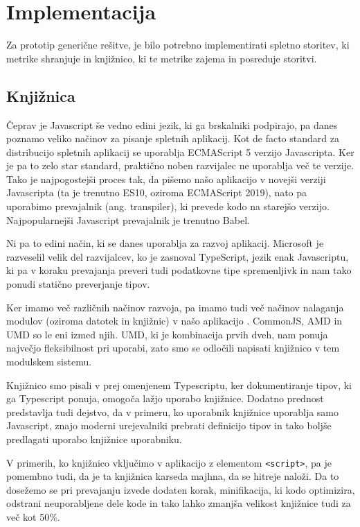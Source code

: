 \documentclass[a4paper, 12pt]{book}
\begin{document}
\section{Implementacija}
\label{ch3:sec2}

Za prototip generične rešitve, je bilo potrebno implementirati spletno storitev, ki metrike shranjuje in knjižnico, ki te metrike zajema in posreduje storitvi.

\subsection{Knjižnica}
\label{ch3:sec2:sub1}

Čeprav je Javascript še vedno edini jezik, ki ga brskalniki podpirajo, pa danes poznamo veliko načinov za pisanje spletnih aplikacij. Kot de facto standard za distribucijo spletnih aplikacij se uporablja ECMAScript 5 verzijo Javascripta. Ker je pa to zelo star standard, praktično noben razvijalec ne uporablja več te verzije. Tako je najpogostejši proces tak, da pišemo našo aplikacijo v novejši verziji Javascripta (ta je trenutno ES10, oziroma ECMAScript 2019), nato pa uporabimo prevajalnik (ang. transpiler), ki prevede kodo na starejšo verzijo. Najpopularnejši Javascript prevajalnik je trenutno Babel.

Ni pa to edini način, ki se danes uporablja za razvoj aplikacij. Microsoft je razveselil velik del razvijalcev, ko je zasnoval TypeScript, jezik enak Javascriptu, ki pa v koraku prevajanja preveri tudi podatkovne tipe spremenljivk in nam tako ponudi statično preverjanje tipov.

Ker imamo več različnih načinov razvoja, pa imamo tudi več načinov nalaganja modulov (oziroma datotek in knjižnic) v našo aplikacijo \cite{js_modules}. CommonJS, AMD in UMD so le eni izmed njih. UMD, ki je kombinacija prvih dveh, nam ponuja največjo fleksibilnost pri uporabi, zato smo se odločili napisati knjižnico v tem modulskem sistemu.

Knjižnico smo pisali v prej omenjenem Typescriptu, ker dokumentiranje tipov, ki ga Typescript ponuja, omogoča lažjo uporabo knjižnice. Dodatno prednost predstavlja tudi dejstvo, da v primeru, ko uporabnik knjižnice uporablja samo Javascript, znajo moderni urejevalniki prebrati definicijo tipov in tako boljše predlagati uporabo knjižnice uporabniku.

V primerih, ko knjižnico vključimo v aplikacijo z elementom \verb|<script>|, pa je pomembno tudi, da je ta knjižnica karseda majhna, da se hitreje naloži. Da to dosežemo se pri prevajanju izvede dodaten korak, minifikacija, ki kodo optimizira, odstrani neuporabljene dele kode in tako lahko zmanjša velikost knjižnice tudi za več kot 50\%.
\end{document}
